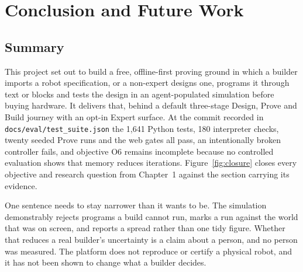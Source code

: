 \documentclass[11pt,a4paper]{report}
\begin{document}
\chapter{Conclusion and Future Work}

\section{Summary}
 This project set out to build a free, offline-first proving ground in which a builder imports a robot specification, or a non-expert designs one, programs it through text or blocks and tests the design in an agent-populated simulation before buying hardware. It delivers that, behind a default three-stage Design, Prove and Build journey with an opt-in Expert surface. At the commit recorded in \texttt{docs/eval/test\_suite.json} the 1,641 Python tests, 180 interpreter checks, twenty seeded Prove runs and the web gates all pass, an intentionally broken controller fails, and objective O6 remains incomplete because no controlled evaluation shows that memory reduces iterations. Figure~\ref{fig:closure} closes every objective and research question from Chapter~1 against the section carrying its evidence.

 One sentence needs to stay narrower than it wants to be. The simulation demonstrably rejects programs a build cannot run, marks a run against the world that was on screen, and reports a spread rather than one tidy figure. Whether that reduces a real builder's uncertainty is a claim about a person, and no person was measured. The platform does not reproduce or certify a physical robot, and it has not been shown to change what a builder decides.
\end{document}

